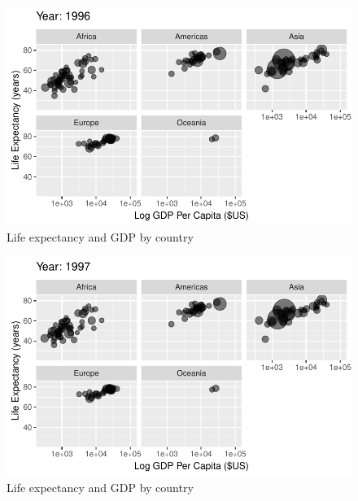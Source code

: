 \documentclass[
  letterpaper,
  DIV=11,
  numbers=noendperiod]{scrreport}
\theoremstyle{definition}
\theoremstyle{remark}
\begin{document}
\begin{figure}

{\centering \includegraphics{index_files/figure-pdf/fig-anim-lifegdp-81.pdf}

}

\caption{\label{fig-anim-lifegdp-81}Life expectancy and GDP by country}

\end{figure}

\begin{figure}

{\centering \includegraphics{index_files/figure-pdf/fig-anim-lifegdp-82.pdf}

}

\caption{\label{fig-anim-lifegdp-82}Life expectancy and GDP by country}

\end{figure}
\end{document}
